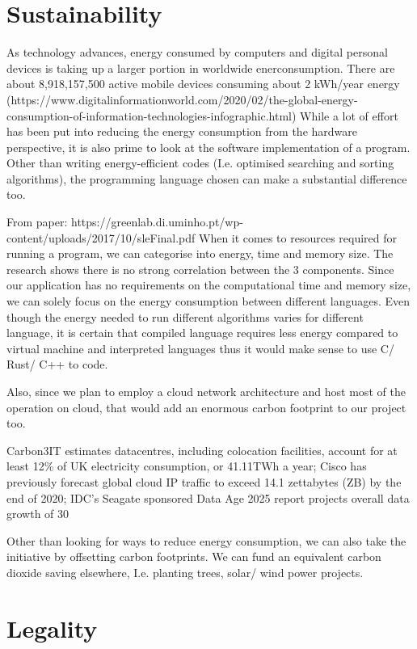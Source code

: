 \section{Sustainability}
As technology advances, energy consumed by computers and digital personal devices is taking up a larger portion in worldwide enerconsumption. There are about 8,918,157,500 active mobile devices consuming about 2 kWh/year energy (https://www.digitalinformationworld.com/2020/02/the-global-energy-consumption-of-information-technologies-infographic.html)
While a lot of effort has been put into reducing the energy consumption from the hardware perspective, it is also prime to look at the software implementation of a program. Other than writing energy-efficient codes (I.e. optimised searching and sorting algorithms), the programming language chosen can make a substantial difference too.

From paper: https://greenlab.di.uminho.pt/wp-content/uploads/2017/10/sleFinal.pdf
When it comes to resources required for running a program, we can categorise into energy, time and memory size. The research shows there is no strong correlation between the 3 components. Since our application has no requirements on the computational time and memory size, we can solely focus on the energy consumption between different languages. Even though the energy needed to run different algorithms varies for different language, it is certain that compiled language requires less energy compared to virtual machine and interpreted languages thus it would make sense to use C/ Rust/ C++ to code.

Also, since we plan to employ a cloud network architecture and host most of the operation on cloud, that would add an enormous carbon footprint to our project too.

Carbon3IT estimates datacentres, including colocation facilities, account for at least 12\% of UK electricity consumption, or 41.11TWh a year; Cisco has previously forecast global cloud IP traffic to exceed 14.1 zettabytes (ZB) by the end of 2020; IDC’s Seagate sponsored Data Age 2025 report projects overall data growth of 30%

Other than looking for ways to reduce energy consumption, we can also take the initiative by offsetting carbon footprints. We can fund an equivalent carbon dioxide saving elsewhere, I.e. planting trees, solar/ wind power projects.


\section{Legality}
